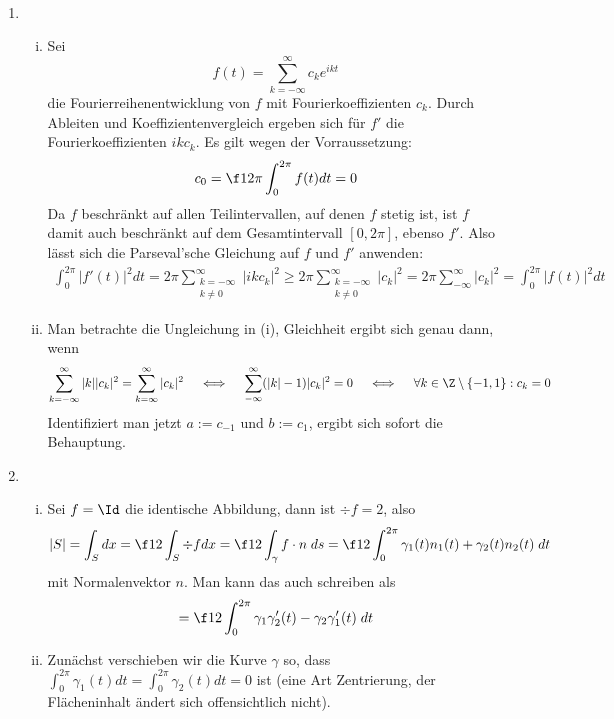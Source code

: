 \documentclass[a4paper]{scrartcl}
\begin{document}
	\setcounter{section}{10}

	\begin{aufgabe}~

		\begin{enumerate}[{Teil} A:]
			\item
				\begin{enumerate}[(i)]
					\item
						Sei
						\[
							f(t) = \sum_{k=-\infty}^\infty c_k e^{ikt}
						\]
						die Fourierreihenentwicklung von $f$ mit Fourierkoeffizienten $c_k$.
						Durch Ableiten und Koeffizientenvergleich ergeben sich für $f'$ die Fourierkoeffizienten $ikc_k$.
						Es gilt wegen der Vorraussetzung:
						\[
							c_0 = \f 1{2\pi}\int_0^{2\pi} f(t) dt = 0
						\]
						Da $f$ beschränkt auf allen Teilintervallen, auf denen $f$ stetig ist, ist $f$ damit auch beschränkt auf dem Gesamtintervall $[0,2\pi]$, ebenso $f'$.
						Also lässt sich die Parseval'sche Gleichung auf $f$ und $f'$ anwenden:
						\begin{align*}
							\int_0^{2\pi} |f'(t)|^2 dt
							= 2\pi \sum_{\substack{k=-\infty\\k\neq 0}}^\infty |ikc_k|^2
							\ge 2\pi \sum_{\substack{k=-\infty\\k\neq 0}}^\infty |c_k|^2
							= 2\pi \sum_{-\infty}^\infty |c_k|^2
							= \int_0^{2\pi} |f(t)|^2 dt
						\end{align*}
					\item
						Man betrachte die Ungleichung in (i), Gleichheit ergibt sich genau dann, wenn
						\begin{align*}
							\sum_{k=-\infty}^\infty |k||c_k|^2 = \sum_{k=\infty}^\infty |c_k|^2
							\quad \iff \quad \sum_{-\infty}^\infty (|k|-1)|c_k|^2 = 0 
							\quad \iff \quad \forall k\in \Z\setminus\{-1,1\} : c_k = 0
						\end{align*}
						Identifiziert man jetzt $a := c_{-1}$ und $b := c_1$, ergibt sich sofort die Behauptung.
				\end{enumerate}
			\item
				\begin{enumerate}[(i)]
					\item
						Sei $f = \Id$ die identische Abbildung, dann ist $\div f = 2$, also
						\[
							|S| = \int_S dx = \f 12 \int_S \div f dx = \f 12 \int_\gamma f \cdot n \; ds = \f 12 \int_0^{2\pi} \gamma_1(t) n_1(t) + \gamma_2(t) n_2(t) \; dt
						\]
						mit Normalenvektor $n$. Man kann das auch schreiben als
						\[
							= \f 12 \int_0^{2\pi} \gamma_1 \gamma_2'(t) - \gamma_2 \gamma_1'(t) \;dt
						\]
					\item
						Zunächst verschieben wir die Kurve $\gamma$ so, dass $\int_0^{2\pi} \gamma_1(t) dt = \int_0^{2\pi} \gamma_2(t) dt = 0$ ist (eine Art Zentrierung, der Flächeninhalt ändert sich offensichtlich nicht).


\end{enumerate}
\end{enumerate}
\end{aufgabe}
\end{document}
